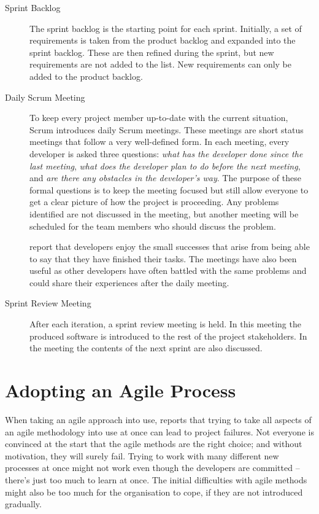 \begin{description}
\item[Sprint Backlog] The sprint backlog is the starting point for 
each sprint. Initially, a set of requirements is taken from the 
product backlog and expanded into the sprint backlog. These are then 
refined during the sprint, but new requirements are not added to the 
list. New requirements can only be added to the product backlog.

\item[Daily Scrum Meeting] To keep every project member up-to-date 
with the current situation, Scrum introduces daily Scrum meetings. 
These meetings are short status meetings that follow a very 
well-defined form. In each meeting, every developer is asked three 
questions: \textsl{what has the developer done since the last 
meeting}, \textsl{what does the developer plan to do before the next 
meeting}, and \textsl{are there any obstacles in the developer's way}. 
The purpose of these formal questions is to keep the meeting focused 
but still allow everyone to get a clear picture of how the project is 
proceeding. Any problems identified are not discussed in the meeting, 
but another meeting will be scheduled for the team members who should 
discuss the problem.

\cite{scrumprocess} report that developers enjoy the small successes 
that arise from being able to say that they have finished their tasks. 
The meetings have also been useful as other developers have often 
battled with the same problems and could share their experiences after 
the daily meeting.

\item[Sprint Review Meeting] After each iteration, a sprint review 
meeting is held. In this meeting the produced software is introduced 
to the rest of the project stakeholders. In the meeting the contents 
of the next sprint are also discussed.
\end{description}



\section{Adopting an Agile Process}
\label{toc:agile:adopt}

When taking an agile approach into use, \cite{agileadoption} reports 
that trying to take all aspects of an agile methodology into use at 
once can lead to project failures. Not everyone is convinced at the 
start that the agile methods are the right choice; and without 
motivation, they will surely fail. Trying to work with many different 
new processes at once might not work even though the developers are 
committed -- there's just too much to learn at once. The initial 
difficulties with agile methods might also be too much for the 
organisation to cope, if they are not introduced gradually.

